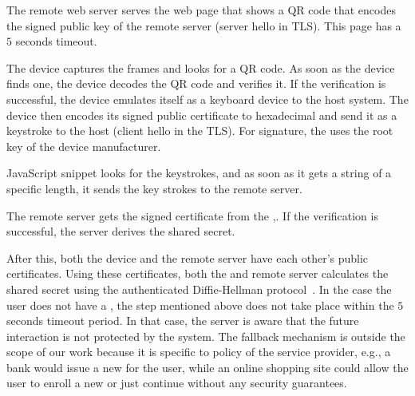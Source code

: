 \begin{mylist}
  \item[\one] The remote web server serves the web page that shows a QR code that encodes the signed public key of the remote server (server hello in TLS). This page has a $5$ seconds timeout.
  \item[\two] The device captures the frames and looks for a QR code. As soon as the device finds one, the device decodes the QR code and verifies it. If the verification is successful, the device emulates itself as a keyboard device to the host system. The device then encodes its signed public certificate to hexadecimal and send it as a keystroke to the host (client hello in the TLS). For signature, the \device uses the root key of the device manufacturer.
  \item[\three] \name  JavaScript snippet looks for the keystrokes, and as soon as it gets a string of a specific length, it sends the key strokes to the remote server.
  \item[\four] The remote server gets the signed certificate from the \device,. If the verification is successful, the server derives the shared secret.
 
\end{mylist}

After this, both the device and the remote server have each other's public certificates. Using these certificates, both the \device and remote server calculates the shared secret using the authenticated Diffie-Hellman protocol~\cite{blake1998authenticated}.
In the case the user does not have a \device, the step mentioned above does not take place within the $5$ seconds timeout period. In that case, the server is aware that the future interaction is not protected by the system. The fallback mechanism is outside the scope of our work because it is specific to policy of the service provider, e.g., a bank would issue a new \device for the user, while an online shopping site could allow the user to enroll a new \device or just continue without any security guarantees.



